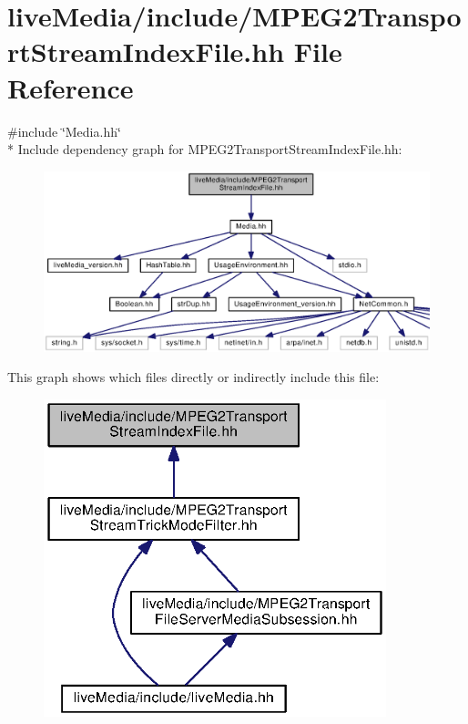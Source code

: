 \section{live\+Media/include/\+M\+P\+E\+G2\+Transport\+Stream\+Index\+File.hh File Reference}
\label{MPEG2TransportStreamIndexFile_8hh}
{\ttfamily \#include \char`\"{}Media.\+hh\char`\"{}}\\*
Include dependency graph for M\+P\+E\+G2\+Transport\+Stream\+Index\+File.\+hh\+:
\nopagebreak
\begin{figure}[H]
\begin{center}
\leavevmode
\includegraphics[width=350pt]{MPEG2TransportStreamIndexFile_8hh__incl}
\end{center}
\end{figure}
This graph shows which files directly or indirectly include this file\+:
\nopagebreak
\begin{figure}[H]
\begin{center}
\leavevmode
\includegraphics[width=282pt]{MPEG2TransportStreamIndexFile_8hh__dep__incl}
\end{center}
\end{figure}
